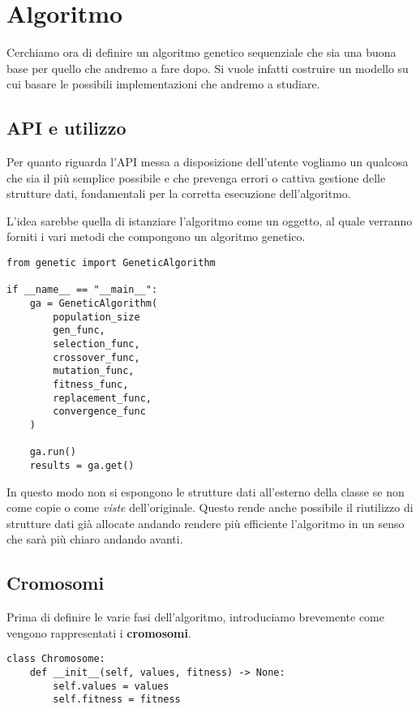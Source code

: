 \section{Algoritmo}

Cerchiamo ora di definire un algoritmo genetico sequenziale che sia una buona
base per quello che andremo a fare dopo. Si vuole infatti costruire un modello
su cui basare le possibili implementazioni che andremo a studiare.

\subsection{API e utilizzo}

Per quanto riguarda l'API messa a disposizione dell'utente vogliamo un qualcosa
che sia il più semplice possibile e che prevenga errori o cattiva gestione
delle strutture dati, fondamentali per la corretta esecuzione dell'algoritmo.

L'idea sarebbe quella di istanziare l'algoritmo come un oggetto, al quale
verranno forniti i vari metodi che compongono un algoritmo genetico.

\begin{verbatim}
from genetic import GeneticAlgorithm

if __name__ == "__main__":
	ga = GeneticAlgorithm(
		population_size
		gen_func,
		selection_func,
		crossover_func,
		mutation_func,
		fitness_func,
		replacement_func,
		convergence_func
	)

	ga.run()
	results = ga.get()
\end{verbatim}

In questo modo non si espongono le strutture dati all'esterno della classe se
non come copie o come \emph{viste} dell'originale. Questo rende anche possibile
il riutilizzo di strutture dati già allocate andando rendere più efficiente
l'algoritmo in un senso che sarà più chiaro andando avanti.

\subsection{Cromosomi}

Prima di definire le varie fasi dell'algoritmo, introduciamo brevemente come
vengono rappresentati i \textbf{cromosomi}.

\begin{verbatim}
class Chromosome:
	def __init__(self, values, fitness) -> None:
		self.values = values
		self.fitness = fitness
\end{verbatim}

